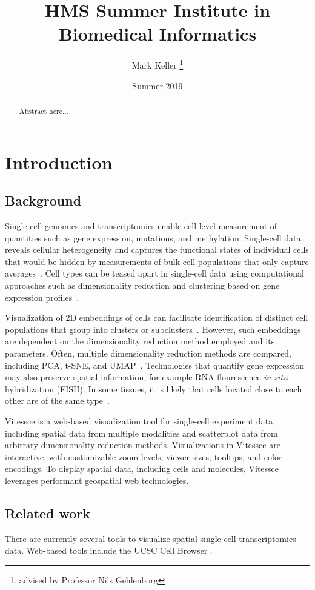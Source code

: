 \documentclass[12pt, letterpaper]{article}
\title{HMS Summer Institute in Biomedical Informatics}
\author{Mark Keller \thanks{advised by Professor Nils Gehlenborg}}
\date{Summer 2019}
\begin{document}
\maketitle

\begin{abstract}
Abstract here...
\end{abstract}

\section{Introduction}
\subsection{Background}
Single-cell genomics and transcriptomics enable cell-level measurement of quantities such as gene expression, mutations, and methylation.
Single-cell data reveals cellular heterogeneity and captures the functional states of individual cells that would be hidden by measurements of bulk cell populations that only capture averages~\cite{shapiro2013single}.
Cell types can be teased apart in single-cell data using computational approaches such as dimensionality reduction and clustering based on gene expression profiles~\cite{stegle2015computational}.

Visualization of 2D embeddings of cells can facilitate identification of distinct cell populations that group into clusters or subclusters~\cite{wang2017visualization}.
However, such embeddings are dependent on the dimensionality reduction method employed and its parameters.
Often, multiple dimensionality reduction methods are compared, including PCA, t-SNE, and UMAP~\cite{becht2019dimensionality}.
Technologies that quantify gene expression may also preserve spatial information, for example RNA flourescence \textit{in situ} hybridization (FISH).
In some tissues, it is likely that cells located close to each other are of the same type~\cite{stegle2015computational}.

Vitessce is a web-based visualization tool for single-cell experiment data, including spatial data from multiple modalities and scatterplot data from arbitrary dimensionality reduction methods.
Visualizations in Vitessce are interactive, with customizable zoom levels, viewer sizes, tooltips, and color encodings.
To display spatial data, including cells and molecules, Vitessce leverages performant geospatial web technologies.


\subsection{Related work}
There are currently several tools to visualize spatial single cell transcriptomics data. 
Web-based tools include the UCSC Cell Browser \cite{nowakowski2017spatiotemporal}.
\end{document}
